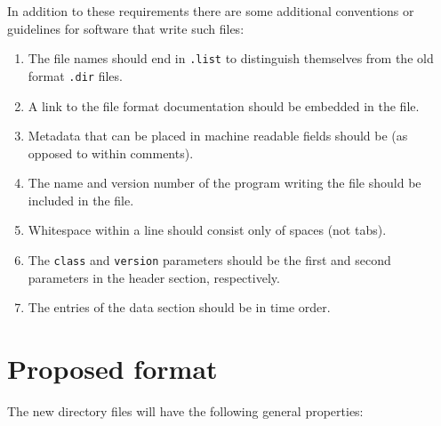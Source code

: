\documentclass[12pt]{article}
\begin{document}
In addition to these requirements there are some additional conventions or guidelines for software that write such files:
\begin{enumerate}
\item The file names should end in {\tt .list} to distinguish themselves from the old format {\tt .dir} files.
\item A link to the file format documentation should be embedded in the file.
\item Metadata that can be placed in machine readable fields should be (as opposed to within comments).
\item The name and version number of the program writing the file should be included in the file.
\item Whitespace within a line should consist only of spaces (not tabs).
\item The {\tt class} and {\tt version} parameters should be the first and second parameters in the header section, respectively.
\item The entries of the data section should be in time order.
\end{enumerate}

\section{Proposed format}

The new directory files will have the following general properties:
\end{document}
